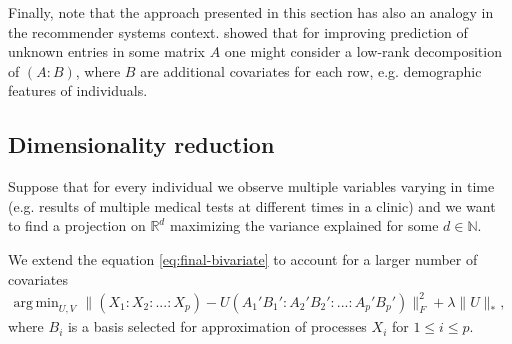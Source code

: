\documentclass[preprint]{imsart}
\numberwithin{equation}{section}
\theoremstyle{plain}
\newcommand{\R}{\mathbb{R}}
\newcommand{\N}{\mathbb{N}}
\DeclareMathOperator*{\argmin}{arg\,min}
\begin{document}
Finally, note that the approach presented in this section has also an analogy in the recommender systems context. \citet{condli1999bayesian} showed that for improving prediction of unknown entries in some matrix $A$ one might consider a low-rank decomposition of $(A:B)$, where $B$ are additional covariates for each row, e.g. demographic features of individuals. %


\subsection{Dimensionality reduction}\label{ss:dim-red}

Suppose that for every individual we observe multiple variables varying in time (e.g. results of multiple medical tests at different times in a clinic) and we want to find a projection on $\R^d$ maximizing the variance explained for some $d \in \N$. %

We extend the equation \eqref{eq:final-bivariate} to account for a larger number of covariates
\begin{align*}%
\argmin_{U,V} &\| (X_1:X_2:...:X_p) - U (A_1'B_1':A_2'B_2':...:A_p'B_p') \|_F^2 + \lambda\|U\|_*,
\end{align*}
where $B_{i}$ is a basis selected for approximation of processes $X_{i}$ for $1 \leq i \leq p$. 
\end{document}
